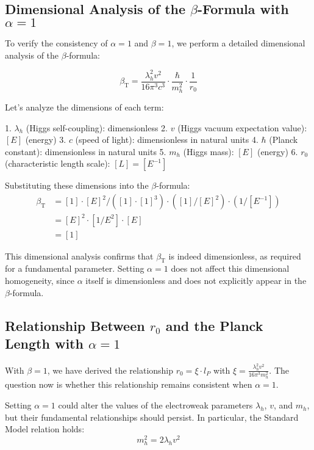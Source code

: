 \documentclass[12pt,a4paper]{article}
\newcommand{\betaT}{\beta_{\text{T}}}
\begin{document}
	\subsection{Dimensional Analysis of the \(\beta\)-Formula with \(\alpha = 1\)}
	
	To verify the consistency of \(\alpha = 1\) and \(\beta = 1\), we perform a detailed dimensional analysis of the \(\beta\)-formula:
	
	\begin{equation}
		\betaT = \frac{\lambda_h^2 v^2}{16\pi^3 c^3} \cdot \frac{\hbar}{m_h^2} \cdot \frac{1}{r_0}
	\end{equation}
	
	Let’s analyze the dimensions of each term:
	
	1. \(\lambda_h\) (Higgs self-coupling): dimensionless
	2. \(v\) (Higgs vacuum expectation value): \([E]\) (energy)
	3. \(c\) (speed of light): dimensionless in natural units
	4. \(\hbar\) (Planck constant): dimensionless in natural units
	5. \(m_h\) (Higgs mass): \([E]\) (energy)
	6. \(r_0\) (characteristic length scale): \([L] = [E^{-1}]\)
	
	Substituting these dimensions into the \(\beta\)-formula:
	\begin{align}
		\betaT &= [1] \cdot [E]^2 / ([1] \cdot [1]^3) \cdot ([1]/[E]^2) \cdot (1/[E^{-1}]) \\
		&= [E]^2 \cdot [1/E^2] \cdot [E] \\
		&= [1]
	\end{align}
	
	This dimensional analysis confirms that \(\betaT\) is indeed dimensionless, as required for a fundamental parameter. Setting \(\alpha = 1\) does not affect this dimensional homogeneity, since \(\alpha\) itself is dimensionless and does not explicitly appear in the \(\beta\)-formula.
	
	\subsection{Relationship Between \(r_0\) and the Planck Length with \(\alpha = 1\)}
	
	With \(\beta = 1\), we have derived the relationship \(r_0 = \xi \cdot l_P\) with \(\xi = \frac{\lambda_h^2 v^2}{16\pi^3 m_h^2}\). The question now is whether this relationship remains consistent when \(\alpha = 1\).
	
	Setting \(\alpha = 1\) could alter the values of the electroweak parameters \(\lambda_h\), \(v\), and \(m_h\), but their fundamental relationships should persist. In particular, the Standard Model relation holds:
	\begin{equation}
		m_h^2 = 2\lambda_h v^2
	\end{equation}
	
\end{document}
